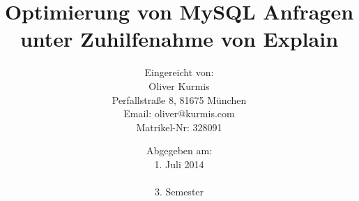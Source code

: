 
\begin{titlepage}
\titlehead{\LARGE \textsc{FOM München\\\large Fachbereich Wirtschaftsinformatik}}
\subject{\vspace{1cm}Seminararbeit}
\title{Optimierung von MySQL Anfragen unter Zuhilfenahme von Explain}
\author{
 {\normalsize Eingereicht von:}
   \\Oliver Kurmis\\
  {\normalsize Perfallstraße 8, 81675 München}\\
  {\normalsize Email: oliver@kurmis.com}\\
  {\normalsize Matrikel-Nr: 328091}
}
\date{{\normalsize Abgegeben am:}\\1. Juli 2014\\\\3. Semester}


\end{titlepage}

\maketitle 

\thispagestyle{empty}
